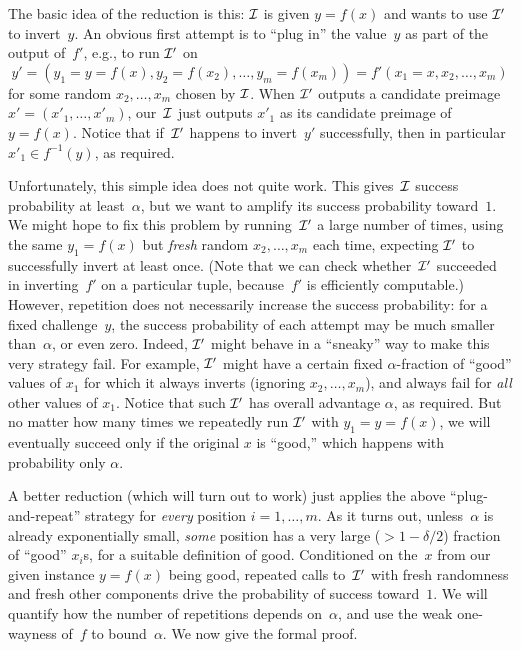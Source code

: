 \documentclass[11pt]{article}
\begin{document}
The basic idea of the reduction is this: $\mathcal{I}$ is given $y = f(x)$ and wants to use $\mathcal{I}'$ to invert~$y$.
An obvious first attempt is to ``plug in'' the value~$y$ as part of the output of~$f'$, e.g., to run $\mathcal{I}'$ on \[ y' = (y_{1} = y = f(x), y_{2} = f(x_{2}), \ldots, y_{m} = f(x_{m})) = f'(x_{1} = x, x_{2}, \ldots, x_{m}) \] for some random $x_{2}, \ldots, x_{m}$ chosen by $\mathcal{I}$.
When $\mathcal{I}'$ outputs a candidate preimage $x'=(x'_{1},\ldots,x'_{m})$, our~$\mathcal{I}$ just outputs $x'_{1}$ as its candidate preimage of $y=f(x)$.
Notice that if~$\mathcal{I}'$ happens to invert~$y'$ successfully, then in particular $x'_{1} \in f^{-1}(y)$, as required.

Unfortunately, this simple idea does not quite work.
This gives~$\mathcal{I}$ success probability at least~$\alpha$, but we want to amplify its success probability toward~$1$.
We might hope to fix this problem by running~$\mathcal{I}'$ a large number of times, using the same $y_{1} = f(x)$ but \emph{fresh} random $x_{2}, \ldots, x_{m}$ each time, expecting $\mathcal{I}'$ to successfully invert at least once.
(Note that we can check whether~$\mathcal{I}'$ succeeded in inverting~$f'$ on a particular tuple, because~$f'$ is efficiently computable.)
However, repetition does not necessarily increase the success probability: for a fixed challenge~$y$, the success probability of each attempt may be much smaller than~$\alpha$, or even zero.
Indeed, $\mathcal{I}'$ might behave in a ``sneaky'' way to make this very strategy fail.
For example, $\mathcal{I}'$ might have a certain fixed $\alpha$-fraction of ``good'' values of $x_{1}$ for which it always inverts (ignoring $x_{2}, \ldots, x_{m}$), and always fail for \emph{all} other values of $x_{1}$.
Notice that such $\mathcal{I}'$ has overall advantage $\alpha$, as required.
But no matter how many times we repeatedly run $\mathcal{I}'$ with $y_{1}=y=f(x)$, we will eventually succeed only if the original $x$ is ``good,'' which happens with probability only $\alpha$.

A better reduction (which will turn out to work) just applies the above ``plug-and-repeat'' strategy for \emph{every} position $i = 1, \ldots, m$.
As it turns out, unless~$\alpha$ is already exponentially small, \emph{some} position has a very large ($> 1-\delta/2$) fraction of ``good'' $x_{i}$s, for a suitable definition of good.
Conditioned on the~$x$ from our given instance $y = f(x)$ being good, repeated calls to~$\mathcal{I}'$ with fresh randomness and fresh other components drive the probability of success toward~$1$.
We will quantify how the number of repetitions depends on~$\alpha$, and use the weak one-wayness of~$f$ to bound~$\alpha$.
We now give the formal proof.
\end{document}

